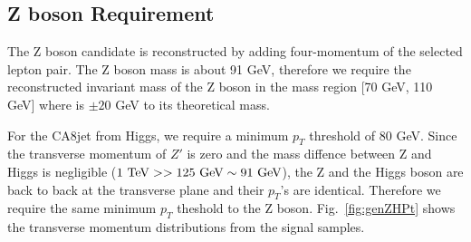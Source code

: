 \subsection{Z boson Requirement}
The Z boson candidate is reconstructed by adding four-momentum of the selected lepton pair. The Z boson mass is about 91 GeV, therefore we require the reconstructed invariant mass of the Z boson in the mass region [70 GeV, 110 GeV] where is $\pm 20$ GeV to its theoretical mass.

For the CA8jet from Higgs, we require a minimum $p_{T}$ threshold of 80 GeV. Since the transverse momentum of $Z'$ is zero and the mass diffence between Z and Higgs is negligible ($1\textup{ TeV} >> 125 \textup{ GeV} \sim 91 \textup{ GeV}$), the Z and the Higgs boson are back to back at the transverse plane and their $p_{T}$'s are identical. Therefore we require the same minimum $p_{T}$ theshold to the Z boson. Fig.~\ref{fig:genZHPt} shows the transverse momentum distributions from the signal samples.

